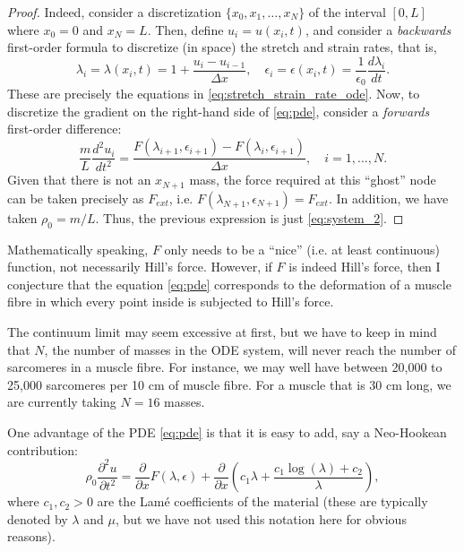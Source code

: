 \documentclass{nmlreport}
\begin{document}
{\begin{proof}
	Indeed, consider a discretization $\{x_0,x_1,\dots,x_N\}$ of the interval $[0,L]$ where $x_0 = 0$ and $x_N = L$. Then, define $u_i = u(x_i,t)$, and consider a \textit{backwards} first-order formula to discretize (in space) the stretch and strain rates, that is,
	\[
		\lambda_i = \lambda(x_i,t) = 1 + \dfrac{u_i - u_{i-1}}{\Delta x}, \quad \epsilon_i = \epsilon(x_i,t) = \dfrac{1}{\epsilon_0} \dfrac{d\lambda_i}{dt}.
	\]
	These are precisely the equations in \eqref{eq:stretch_strain_rate_ode}. Now, to discretize the gradient on the right-hand side of \eqref{eq:pde}, consider a \textit{forwards} first-order difference:
	\[
		\dfrac{m}{L} \dfrac{d^2 u_i}{dt^2} = \dfrac{F(\lambda_{i+1},\epsilon_{i+1}) - F(\lambda_i,\epsilon_{i+1})}{\Delta x}, \quad i = 1,\dots,N.
	\]
	Given that there is not an $x_{N+1}$ mass, the force required at this ``ghost'' node can be taken precisely as $F_{ext}$, i.e. $F(\lambda_{N+1},\epsilon_{N+1}) = F_{ext}$. In addition, we have taken $\rho_0 = m/L$. Thus, the previous expression is just \eqref{eq:system_2}.
\end{proof}


\begin{remark}
	Mathematically speaking, $F$ only needs to be a ``nice'' (i.e. at least continuous) function, not necessarily Hill's force. However, if $F$ is indeed Hill's force, then I conjecture that the equation \eqref{eq:pde} corresponds to the deformation of a muscle fibre in which every point inside is subjected to Hill's force. 
\end{remark}

\begin{remark}
	The continuum limit may seem excessive at first, but we have to keep in mind that $N$, the number of masses in the ODE system, will never reach the number of sarcomeres in a muscle fibre. For instance, we may well have between 20,000 to 25,000 sarcomeres per 10 cm of muscle fibre. For a muscle that is 30 cm long, we are currently taking $N=16$ masses.
\end{remark}

One advantage of the PDE \eqref{eq:pde} is that it is easy to add, say a Neo-Hookean contribution:
\[
	\rho_0 \dfrac{\partial^2 u }{\partial t^2} = \dfrac{\partial}{\partial x} F(\lambda,\epsilon) + \dfrac{\partial}{\partial x} \left( c_1 \lambda + \dfrac{c_1 \log(\lambda) + c_2}{\lambda} \right),
\]
where $c_1,c_2>0$ are the Lam\'{e} coefficients of the material (these are typically denoted by $\lambda$ and $\mu$, but we have not used this notation here for obvious reasons).

}
\end{document}
